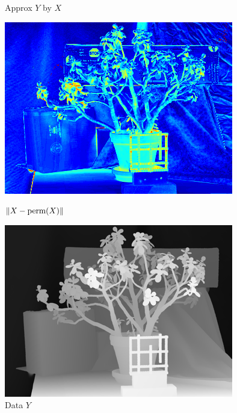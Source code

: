 \documentclass{beamer}
\begin{document}
\begin{frame}
\begin{figure}[ht]
\begin{minipage}[b]{0.32\linewidth}
      \caption{Approx $Y$ by $X$}
    \end{minipage}
    \hfill
    \begin{minipage}[b]{0.32\linewidth}
      \centering
      \includegraphics[width=\textwidth]{./Images/ChangeDetect/JadePlant/ChangesXtoY.png}
      \caption{$\left\lVert X - \text{perm}(X)\right\rVert$}
    \end{minipage}
    \begin{minipage}[b]{0.32\linewidth}
      \centering
      \includegraphics[width=\textwidth]{./Images/ChangeDetect/JadePlant/pictureY.png}
      \caption{Data $Y$}
    \end{minipage}
    \hfill
    \begin{minipage}[b]{0.32\linewidth}

\end{minipage}
\end{figure}
\end{frame}
\end{document}
